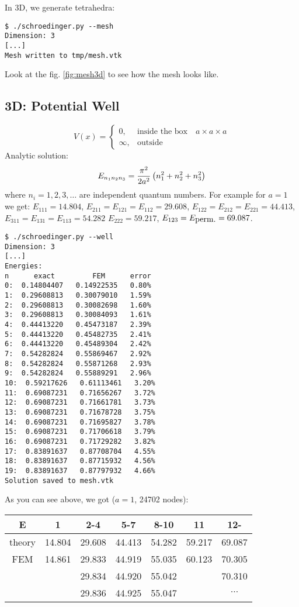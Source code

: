 In 3D, we generate tetrahedra:

\begin{lstlisting}
$ ./schroedinger.py --mesh
Dimension: 3
[...]
Mesh written to tmp/mesh.vtk
\end{lstlisting}

Look at the fig. \ref{fig:mesh3d} to see how the mesh looks like.


\subsection{3D: Potential Well}

$$V(x)=\begin{cases}0,&\text{inside the box}\quad a\times a\times a \\
\infty, & \text{outside}\end{cases}$$
Analytic solution:
$$E_{n_1n_2n_3}={\pi^2\over2a^2}\left(n_1^2 + n_2^2 + n_3^2\right)$$
where $n_i = 1, 2, 3, \dots$ are independent quantum numbers.
For example for $a=1$ we get:
$E_{111}=14.804$, $E_{211}=E_{121}=E_{112}=29.608$,
$E_{122}=E_{212}=E_{221}=44.413$,
$E_{311}=E_{131}=E_{113}=54.282$
$E_{222}=59.217$, $E_{123}=E_{\hbox{perm.}}=69.087$.

\begin{lstlisting}
$ ./schroedinger.py --well
Dimension: 3
[...]
Energies:
n      exact         FEM      error
0:  0.14804407   0.14922535   0.80%
1:  0.29608813   0.30079010   1.59%
2:  0.29608813   0.30082698   1.60%
3:  0.29608813   0.30084093   1.61%
4:  0.44413220   0.45473187   2.39%
5:  0.44413220   0.45482735   2.41%
6:  0.44413220   0.45489304   2.42%
7:  0.54282824   0.55869467   2.92%
8:  0.54282824   0.55871268   2.93%
9:  0.54282824   0.55889291   2.96%
10:  0.59217626   0.61113461   3.20%
11:  0.69087231   0.71656267   3.72%
12:  0.69087231   0.71661781   3.73%
13:  0.69087231   0.71678728   3.75%
14:  0.69087231   0.71695827   3.78%
15:  0.69087231   0.71706618   3.79%
16:  0.69087231   0.71729282   3.82%
17:  0.83891637   0.87708704   4.55%
18:  0.83891637   0.87715932   4.56%
19:  0.83891637   0.87797932   4.66%
Solution saved to mesh.vtk
\end{lstlisting}

As you can see above, we got ($a=1$, 24702 nodes):

\begin{tabular}{ c | c c c c c c }
E      & 1 & 2-4 & 5-7 & 8-10 & 11 & 12- \\
\hline
theory & 14.804 & 29.608 & 44.413 & 54.282 & 59.217 & 69.087 \\
FEM    & 14.861 & 29.833 & 44.919 & 55.035 & 60.123 & 70.305 \\
       &        & 29.834 & 44.920 & 55.042 &        & 70.310 \\
       &        & 29.836 & 44.925 & 55.047 &        & $\cdots$ \\
\end{tabular}

